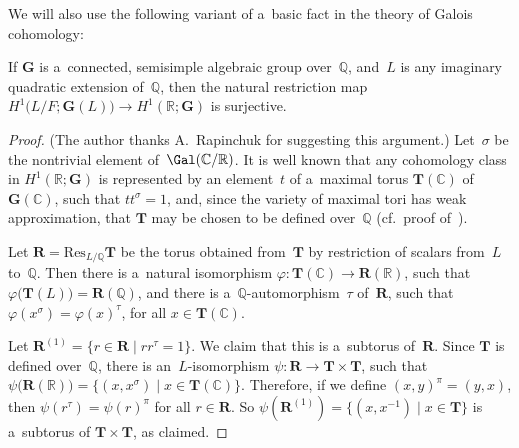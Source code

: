 We will also use the following variant of a~basic fact in the theory of Galois cohomology:

\begin{lem}\label{KneserHasse}
If $\mathbf{G}$ is a~connected, semisimple algebraic group over~$\mathbb{Q}$, and~$L$ is any imaginary quadratic
extension of~$\mathbb{Q}$, then the natural restriction map $H^1 \bigl(L/F; \mathbf{G}(L) \bigr) \to H^1 (\mathbb{R};
\mathbf{G})$ is surjective.
\end{lem}

\begin{proof}(The author thanks A.~Rapinchuk for suggesting this argument.) Let~$\sigma$ be the nontrivial element of~$\Gal(\mathbb{C}/\mathbb{R})$.
It is well known that any cohomology class in $H^1(\mathbb{R}; \mathbf{G})$ is represented by an element~$t$ of
a~maximal torus $\mathbf{T}(\mathbb{C})$ of $\mathbf{G}(\mathbb{C})$, such that $t t^\sigma = 1$, and, since the variety
of maximal tori has weak approximation, that $\mathbf{T}$ may be chosen to be def\/ined over~$\mathbb{Q}$ (cf.\ proof
of~\cite[Proposition~6.17, p.~337]{PlatonovRapinchukBook}).

Let $\mathbf{R} = \mathrm{Res}_{L/\mathbb{Q}} \mathbf{T}$ be the torus obtained from~$\mathbf{T}$ by restriction of
scalars from~$L$ to~$\mathbb{Q}$.
Then there is a~natural isomorphism $\varphi \colon \mathbf{T}(\mathbb{C}) \to \mathbf{R}(\mathbb{R})$, such that
$\varphi \bigl(\mathbf{T}(L) \bigr) = \mathbf{R}(\mathbb{Q})$, and there is a~$\mathbb{Q}$-automorphism~$\tau$
of~$\mathbf{R}$, such that $\varphi(x^\sigma) = \varphi(x)^\tau$, for all $x \in \mathbf{T}(\mathbb{C})$.

Let $\mathbf{R}^{(1)} = \{ r \in \mathbf{R} \mid r r^\tau = 1 \}$.
We claim that this is a~subtorus of~$\mathbf{R}$.
Since $\mathbf{T}$ is def\/ined over~$\mathbb{Q}$, there is an~$L$-isomorphism $\psi \colon \mathbf{R} \to \mathbf{T}
\times \mathbf{T}$, such that $\psi \bigl(\mathbf{R}(\mathbb{R}) \bigr) = \{ (x, x^\sigma) \mid x \in
\mathbf{T}(\mathbb{C}) \}$.
Therefore, if we def\/ine $(x,y)^\pi = (y,x)$, then $\psi(r^\tau) = \psi(r)^\pi$ for all $r \in \mathbf{R}$.
So $\psi(\mathbf{R}^{(1)}) = \{ (x, x^{-1}) \mid x \in \mathbf{T} \}$ is a~subtorus of $\mathbf{T} \times \mathbf{T}$,
as claimed.


\end{proof}
